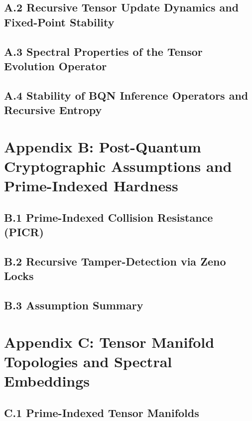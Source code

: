 \subsection{A.2 Recursive Tensor Update Dynamics and Fixed-Point Stability}

\subsection{A.3 Spectral Properties of the Tensor Evolution Operator}

\subsection{A.4 Stability of BQN Inference Operators and Recursive Entropy}

\section{Appendix B: Post-Quantum Cryptographic Assumptions and Prime-Indexed Hardness}
\subsection{B.1 Prime-Indexed Collision Resistance (PICR)}

\subsection{B.2 Recursive Tamper-Detection via Zeno Locks}

\subsection{B.3 Assumption Summary}

\section{Appendix C: Tensor Manifold Topologies and Spectral Embeddings}
\subsection{C.1 Prime-Indexed Tensor Manifolds}

